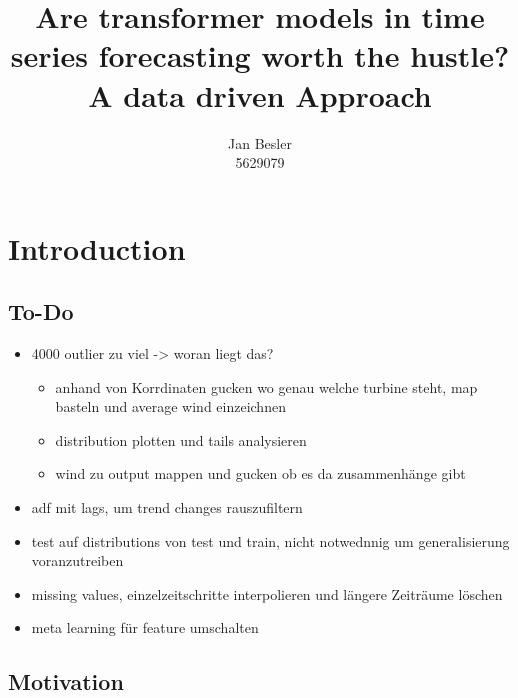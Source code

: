 \documentclass{article}
\title{Are transformer models in time series forecasting worth the hustle? \\
        \Large A data driven Approach}
\author{Jan Besler \\
        5629079}
\begin{document}
\maketitle

\tableofcontents

\newpage

\section{Introduction}

\subsection{To-Do}

\begin{itemize}
    \item 4000 outlier zu viel -> woran liegt das?
    \begin{itemize}
        \item anhand von Korrdinaten gucken wo genau welche turbine steht, map basteln und average wind einzeichnen
        \item distribution plotten und tails analysieren
        \item wind zu output mappen und gucken ob es da zusammenhänge gibt
    \end{itemize}
    \item adf mit lags, um trend changes rauszufiltern
    \item test auf distributions von test und train, nicht notwednnig um generalisierung voranzutreiben
    \item missing values, einzelzeitschritte interpolieren und längere Zeiträume löschen
    \item meta learning für feature umschalten
\end{itemize}

\subsection{Motivation}
\end{document}
